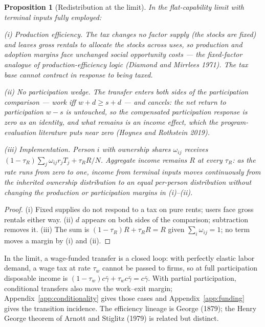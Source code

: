 \documentclass[12pt]{article}
\theoremstyle{plain}
\newtheorem{proposition}{Proposition}
\begin{document}
\begin{proposition}[Redistribution at the limit]\label{prop:welfare}
In the flat-capability limit with terminal inputs fully employed:

(i) \emph{Production efficiency.} The tax changes no factor supply (the stocks are fixed) and leaves gross rentals to allocate the stocks across uses, so production and adoption margins face unchanged social opportunity costs --- the fixed-factor analogue of production-efficiency logic (Diamond and Mirrlees 1971). The tax base cannot contract in response to being taxed.

(ii) \emph{No participation wedge.} The transfer enters both sides of the participation comparison --- work iff $w + d \ge s + d$ --- and cancels: the net return to participation $w - s$ is untouched, so the compensated participation response is zero as an identity, and what remains is an income effect, which the program-evaluation literature puts near zero (Hoynes and Rothstein 2019).

(iii) \emph{Implementation.} Person $i$ with ownership shares $\omega _{ij}$ receives $(1-\tau _R)\sum _j\omega _{ij}r_jT_j+\tau _RR/N$. Aggregate income remains $R$ at every $\tau _R$: as the rate runs from zero to one, income from terminal inputs moves continuously from the inherited ownership distribution to an equal per-person distribution without changing the production or participation margins in (i)--(ii).
\end{proposition}

\begin{proof}
(i) Fixed supplies do not respond to a tax on pure rents; users face gross rentals either way. (ii) $d$ appears on both sides of the comparison; subtraction removes it. (iii) The sum is $(1-\tau _R)R + \tau _R R = R$ given $\sum _i\omega _{ij} = 1$; no term moves a margin by (i) and (ii).
\end{proof}

In the limit, a wage-funded transfer is a closed loop: with perfectly elastic labor demand, a wage tax at rate $\tau_w$ cannot be passed to firms, so at full participation disposable income is $(1-\tau_w)c\bar{\gamma}+\tau_wc\bar{\gamma}=c\bar{\gamma}$. With partial participation, conditional transfers also move the work--exit margin; Appendix~\ref{app:conditionality} gives those cases and Appendix~\ref{app:funding} gives the transition incidence. The efficiency lineage is George (1879); the Henry George theorem of Arnott and Stiglitz (1979) is related but distinct.
\end{document}
